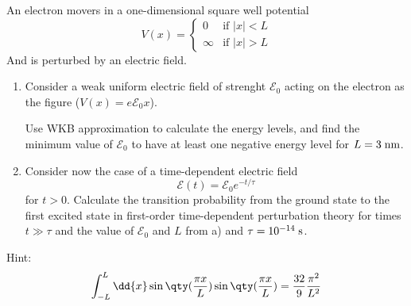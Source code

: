 \begin{esercizio}
   An electron movers in a one-dimensional square well potential
   \begin{equation*}
      V(x)=
      \begin{cases}
         0 & \text{if } |x|<L\\
         \infty & \text{if } |x|>L
      \end{cases}
   \end{equation*}
   And is perturbed by an electric field.
   \begin{enumerate}[label=\alph*), leftmargin=0.6cm]
      \item Consider a weak uniform electric field of strenght $\mathcal{E}_0$ acting on the electron as the figure ($V(x)= e \mathcal{E}_0 x$).
      \begin{figure}[H]
         \centering
      \end{figure}
      Use WKB approximation to calculate the energy levels, and find the minimum value of $\mathcal{E}_0$ to have at least one negative energy level for $L=3 \; \rm nm$.
      \item Consider now the case of a time-dependent electric field
      \begin{equation*}
         \mathcal{E}(t)
         =\mathcal{E}_0 e^{-t/\tau}
      \end{equation*}
      for $t>0$. Calculate the transition probability from the ground state to the first excited state in first-order time-dependent perturbation theory for times $t \gg \tau$ and the value of $\mathcal{E}_0$ and $L$ from a) and $\tau=10^{-14} \; \rm s$.
   \end{enumerate}
   Hint:
   \begin{equation*}
      \int_{-L}^{L} \dd{x} \sin{ \qty( \frac{\pi x}{L} ) } \sin{ \qty( \frac{\pi x}{L} ) }
      =\frac{32}{9} \frac{\pi^2}{L^2}
   \end{equation*}
\end{esercizio}
